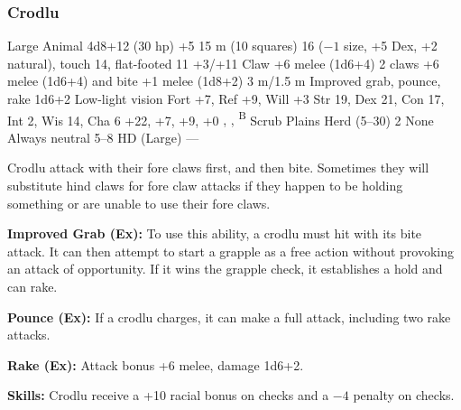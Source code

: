 \subsubsection{Crodlu}
\begin{MonsterStats}
{Large Animal}
{4d8+12 (30 hp)}
{+5}
{15 m (10 squares)}
{16 ($-1$ size, +5 Dex, +2 natural), touch 14, flat-footed 11}
{+3/+11}
{Claw +6 melee (1d6+4)}
{2 claws +6 melee (1d6+4) and bite +1 melee (1d8+2)}
{3 m/1.5 m}
{Improved grab, pounce, rake 1d6+2}
{Low-light vision}
{Fort +7, Ref +9, Will +3}
{Str 19, Dex 21, Con 17, Int 2, Wis 14, Cha 6}
{ +22,  +7,  +9,  +0}
{, , \textsuperscript{B}}
{Scrub Plains}
{Herd (5--30)}
{2}
{None}
{Always neutral}
{5--8 HD (Large)}
{---}
\end{MonsterStats}


Crodlu attack with their fore claws first, and then bite. Sometimes they will substitute hind claws for fore claw attacks if they happen to be holding something or are unable to use their fore claws.

\textbf{Improved Grab (Ex):} To use this ability, a crodlu must hit with its bite attack. It can then attempt to start a grapple as a free action without provoking an attack of opportunity. If it wins the grapple check, it establishes a hold and can rake.

\textbf{Pounce (Ex):} If a crodlu charges, it can make a full attack, including two rake attacks.

\textbf{Rake (Ex):} Attack bonus +6 melee, damage 1d6+2.

\textbf{Skills:} Crodlu receive a +10 racial bonus on  checks and a $-4$ penalty on  checks.
